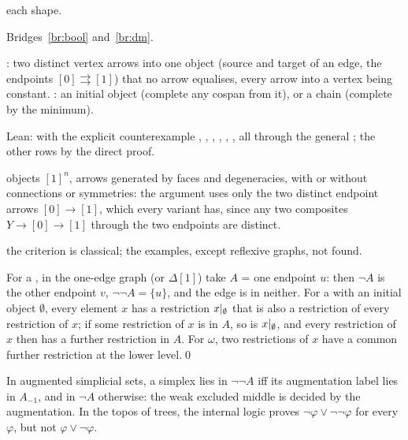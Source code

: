 \begin{trace}
\item[deck] each shape.
\item[arch] Bridges~\ref{br:bool} and~\ref{br:dm}.
\item[specialise] : two distinct vertex arrows into one object (source and target of an edge, the endpoints $[0]\rightrightarrows[1]$) that no arrow equalises, every arrow into a vertex being constant. : an initial object (complete any cospan from it), or a chain (complete by the minimum).
\item[verify] Lean:  with the explicit counterexample , , , , , , all through the general ; the other rows by the direct proof.
\item[cubes] objects $[1]^n$, arrows generated by faces and degeneracies, with or without connections or symmetries: the  argument uses only the two distinct endpoint arrows $[0]\to[1]$, which every variant has, since any two composites $Y\to[0]\to[1]$ through the two endpoints are distinct.
\item[novelty] the criterion is classical; the examples, except reflexive graphs, not found.
\end{trace}

\direct{} For a , in the one-edge graph (or $\Delta[1]$) take $A$ = one endpoint $u$: then $\neg A$ is the other endpoint $v$, $\neg\neg A = \{u\}$, and the edge is in neither. For a  with an initial object $\emptyset$, every element $x$ has a restriction $x|_{\emptyset}$ that is also a restriction of every restriction of $x$; if some restriction of $x$ is in $A$, so is $x|_{\emptyset}$, and every restriction of $x$ then has a further restriction in $A$. For $\omega$, two restrictions of $x$ have a common further restriction at the lower level.\qed

\begin{example}
In augmented simplicial sets, a simplex lies in $\neg\neg A$ iff its augmentation label lies in $A_{-1}$, and in $\neg A$ otherwise: the weak excluded middle is decided by the augmentation. In the topos of trees, the internal logic proves $\neg\varphi\vee\neg\neg\varphi$ for every $\varphi$, but not $\varphi\vee\neg\varphi$.
\end{example}
